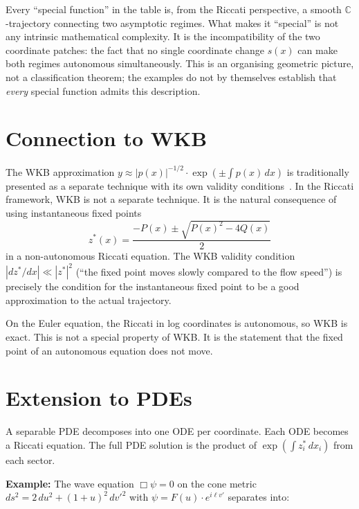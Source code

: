 \documentclass{amsart}
\theoremstyle{definition}
\theoremstyle{remark}
\begin{document}
\medskip

Every ``special function'' in the table is, from the Riccati perspective, a smooth $\mathbb{C}$-trajectory connecting two asymptotic regimes. What makes it ``special'' is not any intrinsic mathematical complexity. It is the incompatibility of the two coordinate patches: the fact that no single coordinate change $s(x)$ can make both regimes autonomous simultaneously. This is an organising geometric picture, not a classification theorem; the examples do not by themselves establish that \emph{every} special function admits this description.

\section{Connection to WKB}

The WKB approximation $y \approx |p(x)|^{-1/2}\cdot\exp(\pm\int p(x)\,dx)$ is traditionally presented as a separate technique with its own validity conditions~\cite{Olver1974, BenOrszag1978}. In the Riccati framework, WKB is not a separate technique. It is the natural consequence of using instantaneous fixed points
\[
z^*(x) = \frac{-P(x) \pm \sqrt{P(x)^2 - 4Q(x)}}{2}
\]
in a non-autonomous Riccati equation. The WKB validity condition $|dz^*/dx| \ll |z^*|^2$ (``the fixed point moves slowly compared to the flow speed'') is precisely the condition for the instantaneous fixed point to be a good approximation to the actual trajectory.

On the Euler equation, the Riccati in log coordinates is autonomous, so WKB is exact. This is not a special property of WKB. It is the statement that the fixed point of an autonomous equation does not move.

\section{Extension to PDEs}

A separable PDE decomposes into one ODE per coordinate. Each ODE becomes a Riccati equation. The full PDE solution is the product of $\exp(\int z_i^*\,dx_i)$ from each sector.

\textbf{Example:} The wave equation $\Box\psi = 0$ on the cone metric $ds^2 = 2\,du^2 + (1+u)^2\,dv'^2$ with $\psi = F(u)\cdot e^{i\ell v'}$ separates into:
\end{document}
